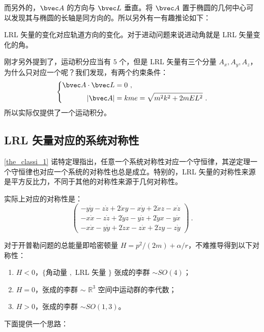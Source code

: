 而另外的，$\bvec A$ 的方向与 $\bvec L$ 垂直。将 $\bvec A$ 置于椭圆的几何中心可以发现其与椭圆的长轴是同方向的。所以另外有一有趣推论如下：
\begin{corollary}{}
LRL 矢量的变化对应轨道方向的变化。对于进动问题来说进动角就是 LRL 矢量变化的角。
\end{corollary}

刚才另外提到了，运动积分应当有 $5$ 个，但是 LRL 矢量有三个分量 $A_x, A_y, A_z$，为什么只对应一个呢？我们发现，有两个约束条件：
\begin{equation}
\left\{
\begin{aligned}
\bvec A \cdot \bvec L &= 0 ~, \\
|\bvec A| &= kme = \sqrt{m^2k^2 + 2m E L^2} ~. 
\end{aligned}
\right.
\end{equation}
所以实际仅提供了一个运动积分。

\subsection{LRL 矢量对应的系统对称性}
\autoref{the_classi_1}  诺特定理指出，任意一个系统对称性对应一个守恒律，其逆定理一个守恒律也对应一个系统的对称性也总是成立。特别的，LRL 矢量的对称性来源是平方反比力，不同于其他的对称性来源于几何对称性。

实际上对应的对称性是：
\begin{equation}
\begin{pmatrix}
-y\dot y-z\dot z+2\dot x y -x \dot y +2\dot x z-x\dot z \\
-x \dot x - z \dot z + 2 \dot y z - y \dot z + 2 \dot y x - y \dot x \\
-x \dot x - y \dot y + 2 \dot z x - z \dot x + 2 \dot z y - z \dot y 
\end{pmatrix} ~.
\end{equation}

对于开普勒问题的总能量即哈密顿量 $H = p^2/(2m) + \alpha/r$，不难推导得到以下对称性：
\begin{enumerate}
\item $H < 0$，$\{$角动量 $,$ LRL 矢量 $\}$ 张成的李群 $\sim SO(4)$；
\item $H = 0 $，张成的李群 $\sim$ $\mathbb R^3$ 空间中运动群的李代数；
\item $H > 0$，张成的李群 $\sim SO(1, 3)$。
\end{enumerate}
下面提供一个思路：


